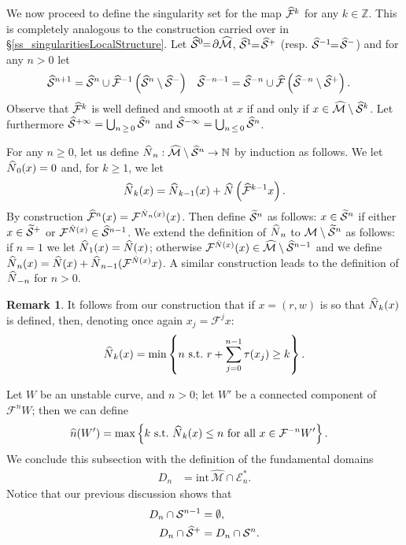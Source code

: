 \documentclass[10pt]{amsart}
\theoremstyle{definition}\newtheorem{defi}[theo]{Definition}\newtheorem{rema}[theo]{Remark}\newtheorem{exam}[theo]{Example}\newtheorem{exem}[theo]{Example}\newtheorem{nota}[theo]{Notation}
\newcommand{\ct}{r}
\newcommand{\st}{\ \text{s.t.}\ }
\newcommand{\intr}[1]{\mathrm{int}\,#1}
\newcommand{\inv}{^{-1}}
\newcommand{\integers}{\mathbb{Z}}
\newcommand{\bN}{\mathbb{N}}
\newcommand{\cEs}{\mathcal E^{*}}
\newcommand{\cm}{\mathcal{F}}
\newcommand{\csp}{\mathcal{M}}
\newcommand{\cmp}{\hat\cm}
\newcommand{\cspi}{\widehat{\csp}}
\newcommand{\singPrivate}{\mathcal{S}}
\newcommand{\sing}[1]{\singPrivate^{#1}}
\newcommand{\singp}[1]{\hat{\singPrivate}^{#1}}
\newcommand{\singt}[1]{\tilde{\singPrivate}^{#1}}
\newcommand{\Np}{\hat N}
\newcommand{\Dom}{D}
\let\oldtilde\tilde
\renewcommand*{\tilde}[1]{\mathchoice{\widetilde{#1}}{\widetilde{#1}}{\oldtilde{#1}}{\oldtilde{#1}}}
\let\oldhat\hat
\renewcommand*{\hat}[1]{\mathchoice{\widehat{#1}}{\widehat{#1}}{\oldhat{#1}}{\oldhat{#1}}}
\begin{document}
We now proceed to define the singularity set for the map $\cmp^k$ for any $k\in\integers$. This is completely analogous to the construction carried over in \S\ref{ss_singularitiesLocalStructure}. Let $\singp0\!\!=\!\partial\cspi$, $\singp1\!\!=\!\singp+$ (resp. $\singp{-1}\!\!=\! \singp-$) and for any $n > 0$ let
\begin{align*}
\singp{n+1} &=\singp{n}\cup\cmp\inv\left(\singp{n}\setminus\singp-\right) &\singp{-n-1} &=\singp{-n}\cup\cmp\left(\singp{-n}\setminus\singp+\right).
\end{align*}
Observe that $\cmp^k$ is well defined and smooth at $x$ if and only if $x\in\cspi\setminus\singp{k}$. Let furthermore $\singp{+\infty} = \bigcup_{n\,\ge\,0}\singp{n}$ and $\singp{-\infty} = \bigcup_{n\,\le\,0}\singp{n}$.

For any $n \ge 0$, let us define $\Np_{n}:\cspi\setminus\singp{n}\to\bN$ by induction as follows. We let $\Np_{0}(x) = 0$ and, for $k \ge 1$, we let
\begin{align*}
\Np_{k}(x) = \Np_{k-1}(x)+\Np\left(\cmp^{k -1}x\right).
\end{align*}
By construction $\cmp^{n}(x) = \cm^{\Np_{n}(x)}(x)$. Then define $\singt{n}$ as follows: $x\in\singt{n}$ if either $x\in\singt{+}$ or $\cm^{\Np(x)}\in\singp{n-1}$. We extend the definition of $\Np_{n}$ to $\csp\setminus\singt{n}$ as follows: if $n = 1$ we let $\Np_{1}(x) = \Np(x)$; otherwise $\cm^{\Np(x)}(x)\in\cspi\setminus\singp{n-1}$ and we define $\Np_{n}(x) = \Np(x)+\Np_{n-1}(\cm^{\Np(x)}x)$. A similar construction leads to the definition of $\Np_{-n}$ for $n > 0$.

\begin{rema}\label{remark:definition-Npk}
It follows from our construction that if $x = (r,w)$ is so that $\Np_{k}(x)$ is defined, then, denoting once again $x_{j} = \cm^{j}x$:
\begin{align*}
\Np_{k}(x) = \min \left\{n \st \ct+\sum_{j = 0}^{n-1}\tau(x_{j})\ge k\right\}.
\end{align*}
\end{rema}

Let $W$ be an unstable curve, and $n > 0$; let $W'$ be a connected component of $\cm^{n}W$; then we can define
\begin{align}\label{eq:definition-hatn}
\hat n(W') &= \max \left\{k \st \Np_{k}(x)\le n \text{ for all } x\in \cm^{-n}W'\right\}.
\end{align}
We conclude this subsection with the definition of the fundamental domains
\begin{align}\label{e_fundamentalDomains}
\Dom_n &= \intr\cspi\cap\cEs_n.
\end{align}
Notice that our previous discussion shows that
\begin{subequations}\label{e_domainSingularities}
\begin{align}
\Dom_{n}\cap\sing{n-1} &= \emptyset,\\
\Dom_n\cap\singp+ &= \Dom_n\cap\sing{n}.
\end{align}
\end{subequations}
\end{document}
